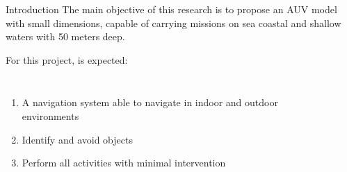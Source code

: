 \begin{frame}[t]{Introduction} 
    \transdissolve[duration=0.5]
    The main objective of this research is to propose an AUV model with small dimensions, capable of carrying missions on sea coastal and shallow waters with 50 meters deep.

    For this project, is expected: 
    \begin{columns}[t]
          \begin{enumerate}
            \item A navigation system able to navigate in indoor and outdoor environments
            \item Identify and avoid objects
            \item Perform all activities with minimal intervention
          \end{enumerate}
        \begin{center}
            \begin{figure}
            \end{figure}
        \end{center}
    \end{columns}
\end{frame}
   
    
